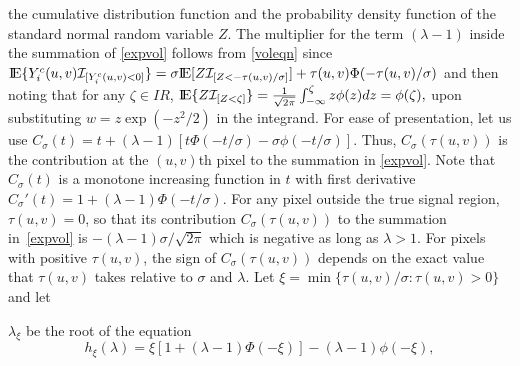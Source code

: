 \documentclass[12pt]{article}
\newcommand{\R}{I\!\!R}
\newcommand{\mI}{\mathcal I}
\newcommand{\E}{\mbox{I\!E}}
\begin{document}
the cumulative distribution function and the probability density
function of the standard normal random variable $Z$. The multiplier for
the term $(\lambda-1)$ inside the summation of \eqref{expvol} follows
from \eqref{voleqn} since 
$  \E\{Y_i^c(u,v)\mI_{[Y^c_i(u,v)<0]}\} =
  \sigma\E[Z\mI_{[Z<-\tau(u,v)/\sigma]}] +\tau(u,v)\Phi(-\tau(u,v)/\sigma) $
  and then noting that for any $\zeta\in\R$,
$    \E\{Z\mI_{[Z < \zeta]}\} = \frac1{\sqrt{2\pi}}\int_{-\infty}^\zeta
  z\phi(z)dz =   \phi(\zeta),$
upon substituting $w=z\exp{(-{z^2}/2)}$ in the integrand. For ease of
presentation, let us use $C_\sigma(t) = t + (\lambda-1) \left[t 
  \Phi\left(-{t}/{\sigma}\right) -
  \sigma\phi\left(-{t}/{\sigma}\right)\right].$ 
Thus, $C_\sigma(\tau(u,v))$ is the contribution at the $(u,v)$th pixel to
the summation in \eqref{expvol}. Note that $C_\sigma(t)$
is a 
monotone increasing function in $t$ with first derivative
$C_\sigma'(t) = 1+(\lambda-1)\Phi(-t/\sigma)$. For any pixel outside
the true signal  
region, $\tau(u,v) = 0$, so that its contribution
$C_\sigma(\tau(u,v))$ to the summation in~\eqref{expvol} is
$-(\lambda-1)\sigma/\sqrt{2\pi}$ which is negative as long as $\lambda >
1$. For pixels with positive $\tau(u,v)$, the sign of
$C_\sigma(\tau(u,v))$ depends on the exact value that $\tau(u,v)$
takes relative to $\sigma$ and $\lambda$. Let $\xi =
\min\{\tau(u,v)/\sigma:\tau(u,v) > 0\}$ and let
\begin{comment}
\begin{wrapfigure}{r}{0.5\textwidth}
  \vspace{-0.25in}
  \begin{center}
    \mbox{
      \texttt{[image: plots/f4\_a]}}
    \caption{Sample elliptical signal region with drawn optimal ellipse matching
      the boundaries.}
    \label{optellipse}
  \end{center}
  \vspace{-0.4in}
\end{wrapfigure}
\end{comment}
$\lambda_\xi$ be the
root of the equation
\begin{equation}
h_\xi(\lambda) = \xi\left[1+(\lambda-1)\Phi(-\xi)\right] -
(\lambda-1)\phi(-\xi),
\label{lambdaeqn}
\end{equation}
\end{document}
